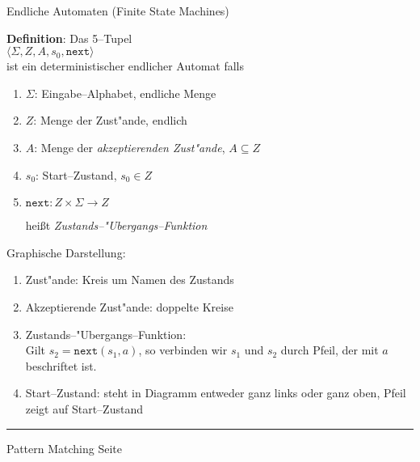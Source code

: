 
\begin{slide}{}
\normalsize

\begin{center}
Endliche Automaten (Finite State Machines)
\end{center}
\vspace*{0.5cm}

\footnotesize
\textbf{Definition}: Das 5--Tupel \\[0.3cm]
\hspace*{1.3cm} $\langle \Sigma, Z, A, s_0, \mathtt{next}  \rangle$ \\[0.3cm]
ist ein deterministischer endlicher Automat falls
\begin{enumerate}
\item $\Sigma$: Eingabe--Alphabet, endliche Menge
\item $Z$: Menge der Zust"ande, endlich
\item $A$: Menge der \emph{akzeptierenden Zust"ande}, $A \subseteq Z$
\item $s_0$: Start--Zustand, $s_0 \in Z$
\item $\mathtt{next}: Z \times \Sigma \rightarrow Z$

      hei{\ss}t \emph{Zustands--"Ubergangs--Funktion}
\end{enumerate}

Graphische Darstellung:
\begin{enumerate}
\item Zust"ande: Kreis um Namen des Zustands
\item Akzeptierende Zust"ande: doppelte Kreise
\item Zustands--"Ubergangs--Funktion: \\
       Gilt $s_2 = \mathtt{next}(s_1, a)$,
      so verbinden wir $s_1$ und $s_2$ durch Pfeil, der mit $a$ beschriftet ist.
\item Start--Zustand: steht in Diagramm entweder ganz links oder ganz oben, Pfeil zeigt auf Start--Zustand
\end{enumerate}


\vspace*{\fill}
\tiny \addtocounter{mypage}{1}
\rule{17cm}{1mm}
Pattern Matching \hspace*{\fill} Seite 
\end{slide}


